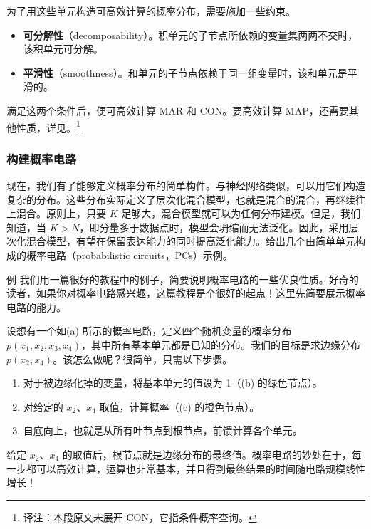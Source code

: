 
为了用这些单元构造可高效计算的概率分布，需要施加一些约束。
\begin{itemize}
\item \textbf{可分解性}（decomposability）。积单元的子节点所依赖的变量集两两不交时，该积单元可分解。
\item \textbf{平滑性}（smoothness）。和单元的子节点依赖于同一组变量时，该和单元是平滑的。
\end{itemize}
满足这两个条件后，便可高效计算 MAR 和 CON。要高效计算 MAP，还需要其他性质，详见。\footnote{译注：本段原文未展开 CON，它指条件概率查询。}

\subsubsection{构建概率电路}
现在，我们有了能够定义概率分布的简单构件。与神经网络类似，可以用它们构造复杂的分布。这些分布实际定义了层次化混合模型，也就是混合的混合，再继续往上混合。原则上，只要 $K$ 足够大，混合模型就可以为任何分布建模。但是，我们知道，当 $K>N$，即分量多于数据点时，模型会坍缩而无法泛化。因此，采用层次化混合模型，有望在保留表达能力的同时提高泛化能力。给出几个由简单单元构成的概率电路（probabilistic circuits，PCs）示例。


\begin{booknote}{例}
我们用一篇很好的教程中的例子，简要说明概率电路的一些优良性质。好奇的读者，如果你对概率电路感兴趣，这篇教程是个很好的起点！这里先简要展示概率电路的能力。

设想有一个如(a) 所示的概率电路，定义四个随机变量的概率分布 $p(x_1,x_2,x_3,x_4)$，其中所有基本单元都是已知的分布。我们的目标是求边缘分布 $p(x_2,x_4)$。该怎么做呢？很简单，只需以下步骤。
\begin{enumerate}
\item 对于被边缘化掉的变量，将基本单元的值设为 1（(b) 的绿色节点）。
\item 对给定的 $x_2$、$x_4$ 取值，计算概率（(c) 的橙色节点）。
\item 自底向上，也就是从所有叶节点到根节点，前馈计算各个单元。
\end{enumerate}
给定 $x_2$、$x_4$ 的取值后，根节点就是边缘分布的最终值。概率电路的妙处在于，每一步都可以高效计算，运算也非常基本，并且得到最终结果的时间随电路规模线性增长！
\end{booknote}

